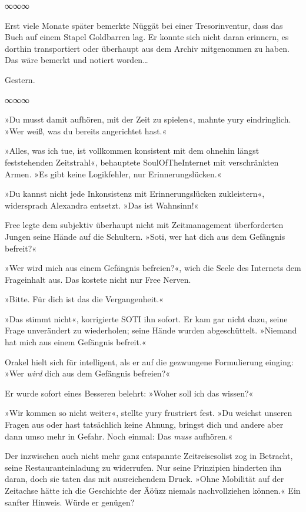 \begin{center}
∞∞∞
\end{center}

Erst viele Monate später bemerkte Nüggät bei einer Tresorinventur, dass das Buch auf einem Stapel Goldbarren lag. Er konnte sich nicht daran erinnern, es dorthin transportiert oder überhaupt aus dem Archiv mitgenommen zu haben. Das wäre bemerkt und notiert worden…


Gestern.

\begin{center}
∞∞∞
\end{center}

»Du musst damit aufhören, mit der Zeit zu spielen«, mahnte yury eindringlich. »Wer weiß, was du bereits angerichtet hast.«

»Alles, was ich tue, ist vollkommen konsistent mit dem ohnehin längst feststehenden Zeitstrahl«, behauptete SoulOfTheInternet mit verschränkten Armen. »Es gibt keine Logikfehler, nur Erinnerungslücken.«

»Du kannst nicht jede Inkonsistenz mit Erinnerungslücken zukleistern«, widersprach Alexandra entsetzt. »Das ist Wahnsinn!«

Free legte dem subjektiv überhaupt nicht mit Zeitmanagement überforderten Jungen seine Hände auf die Schultern. »Soti, wer hat dich aus dem Gefängnis befreit?«

»Wer wird mich aus einem Gefängnis befreien?«, wich die Seele des Internets dem Frageinhalt aus. Das kostete nicht nur Free Nerven.

»Bitte. Für dich ist das die Vergangenheit.«

»Das stimmt nicht«, korrigierte SOTI ihn sofort. Er kam gar nicht dazu, seine Frage unverändert zu wiederholen; seine Hände wurden abgeschüttelt. »Niemand hat mich aus einem Gefängnis befreit.«

Orakel hielt sich für intelligent, als er auf die gezwungene Formulierung einging: »Wer \emph{wird} dich aus dem Gefängnis befreien?«

Er wurde sofort eines Besseren belehrt: »Woher soll ich das wissen?«

»Wir kommen so nicht weiter«, stellte yury frustriert fest. »Du weichst unseren Fragen aus oder hast tatsächlich keine Ahnung, bringst dich und andere aber dann umso mehr in Gefahr. Noch einmal: Das \emph{muss} aufhören.«

Der inzwischen auch nicht mehr ganz entspannte Zeitreisesolist zog in Betracht, seine Restauranteinladung zu widerrufen. Nur seine Prinzipien hinderten ihn daran, doch sie taten das mit ausreichendem Druck. »Ohne Mobilität auf der Zeitachse hätte ich die Geschichte der Äöüzz niemals nachvollziehen können.« Ein sanfter Hinweis. Würde er genügen?

